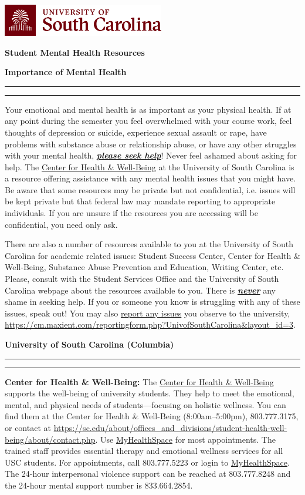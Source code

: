\documentclass[11pt,letterpaper]{article}
\newcommand{\mytitle}[1]{%
\begin{center}
\includegraphics[width=0.53\textwidth]{usc_horzlogo.png} \par\vspace{-0.2cm}
\huge\bfseries\color{scred} #1
\end{center} \par\vspace{0.2\baselineskip}%
}
\newcommand{\mysection}[2]{%
\begin{minipage}{\textwidth}
\phantomsection
	{%
\large\bfseries\color{scred}
#2 \par\vspace{-0.62\baselineskip}
\noindent\rule{#1\textwidth}{1.5pt} \par
\vspace{-0.3cm}\noindent\rule{0.13\textwidth}{5.1pt}%
	}%
\end{minipage}\par\vspace{4\lineskip}%
}
\newcommand{\colortext}[1]{{\bfseries\color{scred}#1}}
\newcommand{\pspecial}{\par\vspace{0.50\baselineskip}}
\begin{document}
\mytitle{Student Mental Health Resources}

\mysection{0.37}{Importance of Mental Health}
Your emotional and mental health is as important as your physical health. If at any point during the semester you feel overwhelmed with your course work, feel thoughts of depression or suicide, experience sexual assault or rape, have problems with substance abuse or relationship abuse, or have any other struggles with your mental health, \underline{\bfseries\itshape please seek help}! Never feel ashamed about asking for help. The \href{https://sc.edu/about/offices\_and\_divisions/student-health-well-being/index.php}{Center for Health \& Well-Being} at the University of South Carolina is a resource offering assistance with any mental health issues that you might have. Be aware that some resources may be private but not confidential, i.e. issues will be kept private but that federal law may mandate reporting to appropriate individuals. If you are unsure if the resources you are accessing will be confidential, you need only ask. \pspecial

There are also a number of resources available to you at the University of South Carolina for academic related issues: Student Success Center, Center for Health \& Well-Being, Substance Abuse Prevention and Education, Writing Center, etc. Please, consult with the Student Services Office and the University of South Carolina webpage about the resources available to you. There is \underline{\bfseries\itshape never} any shame in seeking help. If you or someone you know is struggling with any of these issues, speak out! You may also \href{https://cm.maxient.com/reportingform.php?UnivofSouthCarolina&layout_id=3}{report any issues} you observe to the university, \url{https://cm.maxient.com/reportingform.php?UnivofSouthCarolina&layout_id=3}. \par\vspace{0.7\baselineskip}



\mysection{0.51}{University of South Carolina (Columbia)}

\colortext{Center for Health \& Well-Being:} The \href{https://sc.edu/about/offices\_and\_divisions/student-health-well-being/index.php}{Center for Health \& Well-Being} supports the well-being of university students. They help to meet the emotional, mental, and physical needs of students---focusing on holistic wellness. You can find them at the Center for Health \& Well-Being (8:00am--5:00pm), 803.777.3175, or contact at \url{https://sc.edu/about/offices\_and\_divisions/student-health-well-being/about/contact.php}. Use \href{https://myhealthspace.ushs.sc.edu/login\_dualauthentication.aspx}{MyHealthSpace} for most appointments. The trained staff provides essential therapy and emotional wellness services for all USC students. For appointments, call 803.777.5223 or login to \href{https://myhealthspace.ushs.sc.edu/login\_dualauthentication.aspx}{MyHealthSpace}. The 24-hour interpersonal violence support can be reached at 803.777.8248 and the 24-hour mental support number is 833.664.2854. \pspecial
\end{document}
